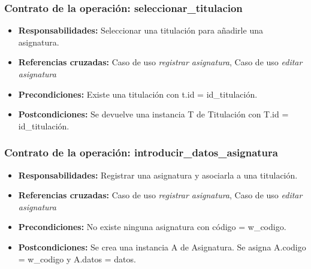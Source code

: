 \documentclass{book}
\begin{document}
\subsubsection{Contrato de la operación: seleccionar\_titulacion}
\begin{itemize}
\item {\bf Responsabilidades:} Seleccionar una titulación para añadirle una asignatura.
\item {\bf Referencias cruzadas:} Caso de uso {\em registrar asignatura}, Caso de uso {\em editar asignatura}
\item {\bf Precondiciones:} Existe una titulación con t.id = id\_titulación.
\item {\bf Postcondiciones:} Se devuelve una instancia T de Titulación con T.id = id\_titulación.
\end{itemize}

\subsubsection{Contrato de la operación: introducir\_datos\_asignatura}
\begin{itemize}
\item {\bf Responsabilidades:} Registrar una asignatura y asociarla a una titulación.
\item {\bf Referencias cruzadas:} Caso de uso {\em registrar asignatura}, Caso de uso {\em editar asignatura}
\item {\bf Precondiciones:} No existe ninguna asignatura con código = w\_codigo.
\item {\bf Postcondiciones:} Se crea una instancia A de Asignatura. Se asigna A.codigo = w\_codigo y A.datos = datos.
\end{itemize}
\end{document}
